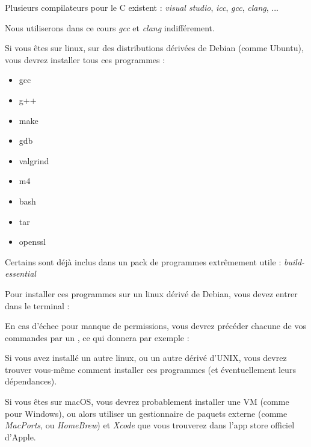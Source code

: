 \documentclass[11pt,a4paper]{article}
\begin{document}
Plusieurs compilateurs pour le C existent : \textit{visual studio}, \textit{icc}, \textit{gcc}, \textit{clang}, ...

Nous utiliserons dans ce cours \textit{gcc} et \textit{clang} indifférement.

\bigskip

Si vous êtes sur linux, sur des distributions dérivées de Debian (comme Ubuntu), vous devrez installer tous ces programmes :

\begin{itemize}
\item gcc
\item g++
\item make
\item gdb
\item valgrind
\item m4
\item bash
\item tar
\item openssl
\end{itemize}

Certains sont déjà inclus dans un pack de programmes extrêmement utile : \textit{build-essential}

\bigskip

Pour installer ces programmes sur un linux dérivé de Debian, vous devez entrer dans le terminal :

\medskip




\medskip

En cas d'échec pour manque de permissions, vous devrez précéder chacune de vos commandes par un , ce qui donnera par exemple :

\medskip


\medskip

Si vous avez installé un autre linux, ou un autre dérivé d'UNIX, vous devrez trouver vous-même comment installer ces programmes (et éventuellement leurs dépendances).

Si vous êtes sur macOS, vous devrez probablement installer une VM (comme pour Windows), ou alors utiliser un gestionnaire de paquets externe (comme \textit{MacPorts}, ou \textit{HomeBrew}) et \textit{Xcode} que vous trouverez dans l'app store officiel d'Apple.
\end{document}
